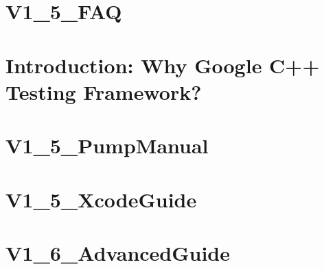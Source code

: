 \documentclass[twoside]{book}
\newcommand{\+}{\discretionary{\mbox{\scriptsize$\hookleftarrow$}}{}{}}
\begin{document}
\chapter{V1\+\_\+5\+\_\+\+F\+AQ}
\label{md__home_bhargavi_Documents_SDR_Copy_Exam_808X_vendor_googletest_googletest_docs_V1_5_FAQ}
\hypertarget{md__home_bhargavi_Documents_SDR_Copy_Exam_808X_vendor_googletest_googletest_docs_V1_5_FAQ}{}

\chapter{Introduction\+: Why Google C++ Testing Framework?}
\label{md__home_bhargavi_Documents_SDR_Copy_Exam_808X_vendor_googletest_googletest_docs_V1_5_Primer}
\hypertarget{md__home_bhargavi_Documents_SDR_Copy_Exam_808X_vendor_googletest_googletest_docs_V1_5_Primer}{}

\chapter{V1\+\_\+5\+\_\+\+Pump\+Manual}
\label{md__home_bhargavi_Documents_SDR_Copy_Exam_808X_vendor_googletest_googletest_docs_V1_5_PumpManual}
\hypertarget{md__home_bhargavi_Documents_SDR_Copy_Exam_808X_vendor_googletest_googletest_docs_V1_5_PumpManual}{}

\chapter{V1\+\_\+5\+\_\+\+Xcode\+Guide}
\label{md__home_bhargavi_Documents_SDR_Copy_Exam_808X_vendor_googletest_googletest_docs_V1_5_XcodeGuide}
\hypertarget{md__home_bhargavi_Documents_SDR_Copy_Exam_808X_vendor_googletest_googletest_docs_V1_5_XcodeGuide}{}

\chapter{V1\+\_\+6\+\_\+\+Advanced\+Guide}
\label{md__home_bhargavi_Documents_SDR_Copy_Exam_808X_vendor_googletest_googletest_docs_V1_6_AdvancedGuide}
\hypertarget{md__home_bhargavi_Documents_SDR_Copy_Exam_808X_vendor_googletest_googletest_docs_V1_6_AdvancedGuide}{}

\end{document}
